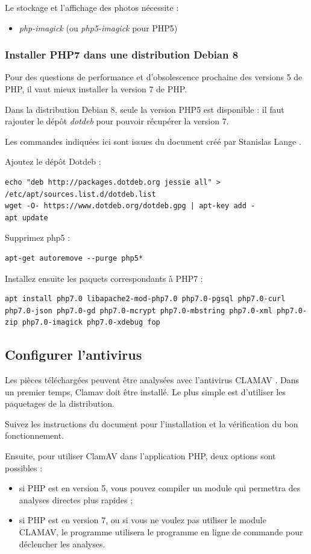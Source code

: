 Le stockage et l'affichage des photos nécessite :
\begin{itemize}
\item \textit{php-imagick} (ou \textit{php5-imagick} pour PHP5)
\end{itemize}

\subsubsection{Installer PHP7 dans une distribution Debian 8}
Pour des questions de performance et d'obsolescence prochaine des versions 5 de PHP, il vaut mieux installer la version 7 de PHP. 

Dans la distribution Debian 8, seule la version PHP5 est disponible : il faut rajouter le dépôt \textit{dotdeb} pour pouvoir récupérer la version 7.

Les commandes indiquées ici sont issues du document créé par Stanislas Lange \cite{debphp7}.

Ajoutez le dépôt Dotdeb :
\begin{lstlisting}
echo "deb http://packages.dotdeb.org jessie all" > /etc/apt/sources.list.d/dotdeb.list
wget -O- https://www.dotdeb.org/dotdeb.gpg | apt-key add -
apt update
\end{lstlisting}

Supprimez php5 :
\begin{lstlisting}
apt-get autoremove --purge php5*
\end{lstlisting}

Installez ensuite les paquets correspondants à PHP7 :

\begin{lstlisting}
apt install php7.0 libapache2-mod-php7.0 php7.0-pgsql php7.0-curl php7.0-json php7.0-gd php7.0-mcrypt php7.0-mbstring php7.0-xml php7.0-zip php7.0-imagick php7.0-xdebug fop
\end{lstlisting}

\subsection{Configurer l'antivirus}
Les pièces téléchargées peuvent être analysées avec l'antivirus CLAMAV \cite{clamav}. Dans un premier temps, Clamav doit être installé. Le plus simple est d'utiliser les paquetages de la distribution.

Suivez les instructions du document \cite{clamavarchlinux} pour l'installation et la vérification du bon fonctionnement.

Ensuite, pour utiliser ClamAV dans l'application PHP, deux options sont possibles :
\begin{itemize}
\item si PHP est en version 5, vous pouvez compiler un module qui permettra des analyses directes plus rapides ;
\item si PHP est en version 7, ou si vous ne voulez pas utiliser le module CLAMAV, le programme utilisera le programme en ligne de commande pour déclencher les analyses.
\end{itemize}

